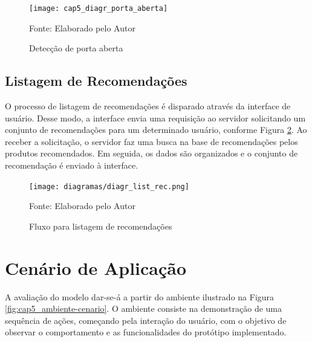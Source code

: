 \begin{figure}[H]
    \caption{Detecção de porta aberta}
    \label{fig:cap5_diagr_porta_aberta}
    \texttt{[image: cap5\_diagr\_porta\_aberta]}
    
    \footnotesize{Fonte: Elaborado pelo Autor}
\end{figure}

\subsection{Listagem de Recomendações} \label{ssec:listagem_rec}

O processo de listagem de recomendações é disparado através da interface de usuário. Desse modo, a interface envia uma requisição ao servidor solicitando um conjunto de recomendações para um determinado usuário, conforme Figura \ref{fig:cap5_diagr_lista_rec}.  Ao receber a solicitação, o servidor faz uma busca na base de recomendações pelos produtos recomendados. Em seguida, os dados são organizados e o conjunto de recomendação é enviado à interface.

\begin{figure}[H]
    \caption{Fluxo para listagem de recomendações}
    \label{fig:cap5_diagr_lista_rec}
    \texttt{[image: diagramas/diagr\_list\_rec.png]}
    
    \footnotesize{Fonte: Elaborado pelo Autor}
\end{figure}


\section{Cenário de Aplicação}

A avaliação do modelo dar-se-á a partir do ambiente ilustrado na Figura \ref{fig:cap5_ambiente-cenario}. O ambiente consiste na demonstração de uma sequência de ações, começando pela interação do usuário, com o objetivo de observar o comportamento e as funcionalidades do protótipo implementado.

